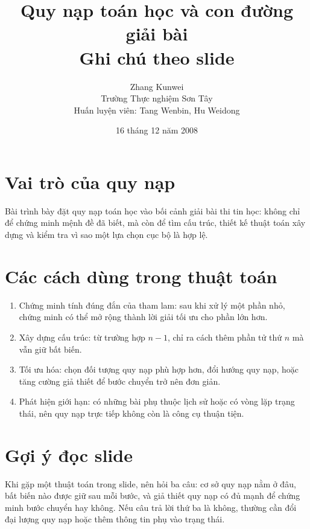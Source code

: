 \documentclass[11pt]{article}
\title{Quy nạp toán học và con đường giải bài\\{\large Ghi chú theo slide}}
\author{Zhang Kunwei\\Trường Thực nghiệm Sơn Tây\\Huấn luyện viên: Tang Wenbin, Hu Weidong}
\date{16 tháng 12 năm 2008}
\begin{document}
\maketitle


\section{Vai trò của quy nạp}

Bài trình bày đặt quy nạp toán học vào bối cảnh giải bài thi tin học: không
chỉ để chứng minh mệnh đề đã biết, mà còn để tìm cấu trúc, thiết kế thuật
toán xây dựng và kiểm tra vì sao một lựa chọn cục bộ là hợp lệ.

\section{Các cách dùng trong thuật toán}

\begin{enumerate}
  \item Chứng minh tính đúng đắn của tham lam: sau khi xử lý một phần nhỏ,
  chứng minh có thể mở rộng thành lời giải tối ưu cho phần lớn hơn.
  \item Xây dựng cấu trúc: từ trường hợp \(n-1\), chỉ ra cách thêm phần tử
  thứ \(n\) mà vẫn giữ bất biến.
  \item Tối ưu hóa: chọn đối tượng quy nạp phù hợp hơn, đổi hướng quy nạp,
  hoặc tăng cường giả thiết để bước chuyển trở nên đơn giản.
  \item Phát hiện giới hạn: có những bài phụ thuộc lịch sử hoặc có vòng lặp
  trạng thái, nên quy nạp trực tiếp không còn là công cụ thuận tiện.
\end{enumerate}

\section{Gợi ý đọc slide}

Khi gặp một thuật toán trong slide, nên hỏi ba câu: cơ sở quy nạp nằm ở đâu,
bất biến nào được giữ sau mỗi bước, và giả thiết quy nạp có đủ mạnh để chứng
minh bước chuyển hay không. Nếu câu trả lời thứ ba là không, thường cần đổi
đại lượng quy nạp hoặc thêm thông tin phụ vào trạng thái.
\end{document}
